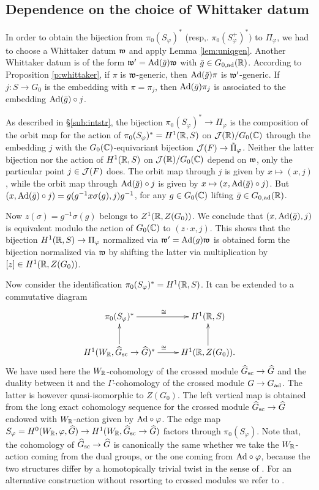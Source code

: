 \documentclass{article}
\theoremstyle{definition}
\numberwithin{equation}{section}
\renewcommand{\-}{\hyp{}}
\begin{document}
\subsection{Dependence on the choice of Whittaker datum} \label{sub:whitdep}

In order to obtain the bijection from $\pi_0(S_\varphi)^*$ (resp,. $\pi_0(S_\varphi^+)^*)$ to $\Pi_\varphi$, we had to choose a Whittaker datum $\mathfrak{w}$ and apply Lemma \ref{lem:uniqgen}. Another Whittaker datum is of the form $\mathfrak{w'}=\textrm{Ad}(\bar g)\mathfrak{w}$ with $\bar g \in G_{0,\textrm{ad}}(\mathbb{R})$. According to Proposition \ref{p:whittaker}, if $\pi$ is $\mathfrak{w}$-generic, then $\textrm{Ad}(\bar g)\pi$ is $\mathfrak{w'}$-generic. If $j : S \to G_0$ is the embedding with $\pi=\pi_j$, then $\textrm{Ad}(\bar g)\pi_j$ is associated to the embedding $\textrm{Ad}(\bar g)\circ j$.

As described in \S\ref{sub:intstr}, the bijection $\pi_0(S_\varphi)^* \to \Pi_\varphi$ is the composition of the orbit map for the action of $\pi_0(S_\varphi)^*=H^1(\mathbb{R},S)$ on $\mathcal{J}(\mathbb{R})/G_0(\mathbb{C})$ through the embedding $j$ with the $G_0(\mathbb{C})$-equivariant bijection $\mathcal{J}(F) \to \tilde\Pi_\varphi$. Neither the latter bijection nor the action of $H^1(\mathbb{R},S)$ on $\mathcal{J}(\mathbb{R})/G_0(\mathbb{C})$ depend on $\mathfrak{w}$, only the particular point $j \in \mathcal{J}(F)$ does. The orbit map through $j$ is given by $x \mapsto (x,j)$, while the orbit map through $\textrm{Ad}(\bar g)\circ j$ is given by $x \mapsto (x,\textrm{Ad}(\bar g)\circ j)$. But $(x,\textrm{Ad}(\bar g)\circ j)=g(g^{-1}x\sigma(g),j)g^{-1}$, for any $g \in G_0(\mathbb{C})$ lifting $\bar g \in G_{0,\textrm{ad}}(\mathbb{R})$.

Now $z(\sigma)=g^{-1}\sigma(g)$ belongs to $Z^1(\mathbb{R},Z(G_0))$. We conclude that $(x,\textrm{Ad}(\bar g),j)$ is equivalent modulo the action of $G_0(\mathbb{C})$ to $(z\cdot x,j)$. This shows that the bijection $H^1(\mathbb{R},S) \to \Pi_\varphi$ normalized via $\mathfrak{w'}=\textrm{Ad}(g)\mathfrak{w}$ is obtained form the bijection normalized via $\mathfrak{w}$ by shifting the latter via multiplication by $[z] \in H^1(\mathbb{R},Z(G_0))$. 

Now consider the identification $\pi_0(S_\varphi)^* = H^1(\mathbb{R},S)$. It can be extended to a commutative diagram
\[ \xymatrix{
	\pi_0(S_\varphi)^*\ar[r]^\cong&H^1(\R,S)\\
	H^1(W_\R,\hat G_\tx{sc} \to \hat G)^*\ar[u]\ar[r]^\cong&H^1(\R,Z(G_0)).\ar[u]
}
\]
We have used here the $W_{\mathbb{R}}$-cohomology of the crossed module $\widehat G_{\textrm{sc}} \to \widehat G$ and the duality between it and the $\Gamma$-cohomology of the crossed module $G \to G_{\textrm{ad}}$. The latter is however quasi-isomorphic to $Z(G_0)$. The left vertical map is obtained from the long exact cohomology sequence for the crossed module $\widehat G_{\textrm{sc}} \to \widehat G$ endowed with $W_{\mathbb{R}}$-action given by $\textrm{Ad}\circ\varphi$. The edge map $S_\varphi=H^0(W_{\mathbb{R}},\varphi,\widehat G) \to H^1(W_{\mathbb{R}},\widehat G_{\textrm{sc}} \to \widehat G)$ factors through $\pi_0(S_\varphi)$. Note that, the cohomology of $\widehat G_{\textrm{sc}} \to \widehat G$ is canonically the same whether we take the $W_{\mathbb{R}}$-action coming from the dual groups, or the one coming from $\textrm{Ad}\circ\varphi$, because the two structures differ by a homotopically trivial twist in the sense of \cite[\S2.4]{KalECI}. For an alternative construction without resorting to crossed modules we refer to \cite[\S4]{KalGen}.
\end{document}
